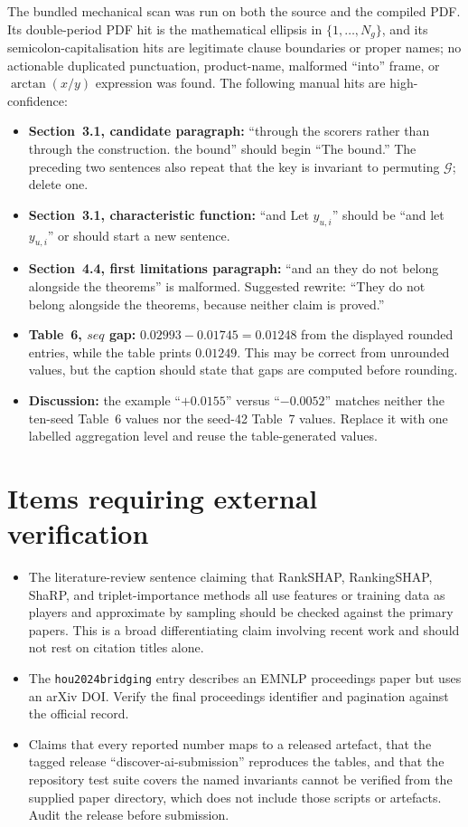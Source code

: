 \documentclass[11pt]{article}
\begin{document}
The bundled mechanical scan was run on both the source and the compiled PDF.  Its double-period PDF hit is the mathematical ellipsis in $\{1,\ldots,N_g\}$, and its semicolon-capitalisation hits are legitimate clause boundaries or proper names; no actionable duplicated punctuation, product-name, malformed ``into'' frame, or $\arctan(x/y)$ expression was found.  The following manual hits are high-confidence:

\begin{itemize}
\item \textbf{Section~3.1, candidate paragraph:} ``through the scorers rather than through the construction. the bound'' should begin ``The bound.''  The preceding two sentences also repeat that the key is invariant to permuting $\mathcal G$; delete one.
\item \textbf{Section~3.1, characteristic function:} ``and Let $y_{u,i}$'' should be ``and let $y_{u,i}$'' or should start a new sentence.
\item \textbf{Section~4.4, first limitations paragraph:} ``and an they do not belong alongside the theorems'' is malformed.  Suggested rewrite: ``They do not belong alongside the theorems, because neither claim is proved.''
\item \textbf{Table~6, $seq$ gap:} $0.02993-0.01745=0.01248$ from the displayed rounded entries, while the table prints $0.01249$.  This may be correct from unrounded values, but the caption should state that gaps are computed before rounding.
\item \textbf{Discussion:} the example ``$+0.0155$'' versus ``$-0.0052$'' matches neither the ten-seed Table~6 values nor the seed-42 Table~7 values.  Replace it with one labelled aggregation level and reuse the table-generated values.
\end{itemize}

\section*{Items requiring external verification}

\begin{itemize}
\item The literature-review sentence claiming that RankSHAP, RankingSHAP, ShaRP, and triplet-importance methods all use features or training data as players and approximate by sampling should be checked against the primary papers.  This is a broad differentiating claim involving recent work and should not rest on citation titles alone.
\item The \texttt{hou2024bridging} entry describes an EMNLP proceedings paper but uses an arXiv DOI.  Verify the final proceedings identifier and pagination against the official record.
\item Claims that every reported number maps to a released artefact, that the tagged release ``discover-ai-submission'' reproduces the tables, and that the repository test suite covers the named invariants cannot be verified from the supplied paper directory, which does not include those scripts or artefacts.  Audit the release before submission.
\end{itemize}
\end{document}
